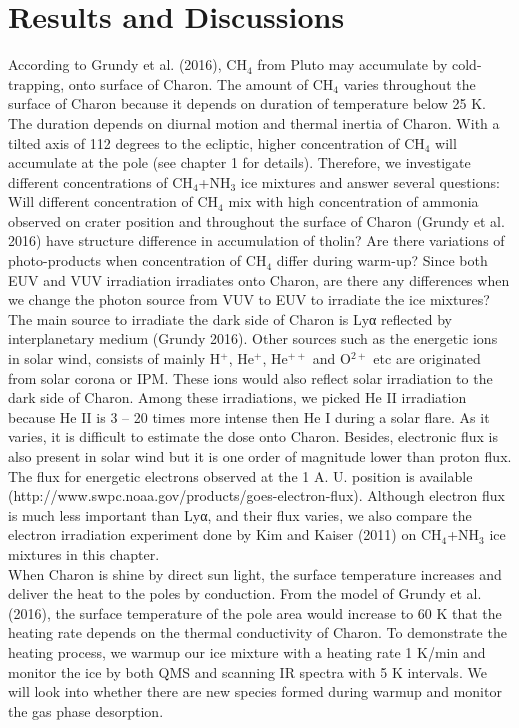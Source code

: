 \chapter{\protect Results and Discussions}

According to Grundy et al. (2016), CH$_4$ from Pluto may accumulate by cold-trapping, onto surface of Charon. The amount of CH$_4$ varies throughout the surface of Charon because it depends on duration of temperature below 25 K. The duration depends on diurnal motion and thermal inertia of Charon. With a tilted axis of 112 degrees to the ecliptic, higher concentration of CH$_4$ will accumulate at the pole (see chapter 1 for details). Therefore, we investigate different concentrations of CH$_4$+NH$_3$ ice mixtures and answer several questions: Will different concentration of CH$_4$ mix with high concentration of ammonia observed on crater position and throughout the surface of Charon (Grundy et al. 2016) have structure difference in accumulation of tholin? Are there variations of photo-products when concentration of CH$_4$ differ during warm-up? Since both EUV and VUV irradiation irradiates onto Charon, are there any differences when we change the photon source from VUV to EUV to irradiate the ice mixtures?\\

The main source to irradiate the dark side of Charon is Lyα reflected by interplanetary medium (Grundy 2016). Other sources such as the energetic ions in solar wind, consists of mainly H$^+$, He$^+$, He$^{++}$ and O$^{2+}$ etc are originated from solar corona or IPM. These ions would also reflect solar irradiation to the dark side of Charon. Among these irradiations, we picked He II irradiation because He II is 3 – 20 times more intense then He I during a solar flare. As it varies, it is difficult to estimate the dose onto Charon. Besides, electronic flux is also present in solar wind but it is one order of magnitude lower than proton flux. The flux for energetic electrons observed at the 1 A. U. position is available (http://www.swpc.noaa.gov/products/goes-electron-flux). Although electron flux is much less important than Lyα, and their flux varies, we also compare the electron irradiation experiment done by Kim and Kaiser (2011) on CH$_4$+NH$_3$ ice mixtures in this chapter. \\

When Charon is shine by direct sun light, the surface temperature increases and deliver the heat to the poles by conduction. From the model of Grundy et al. (2016), the surface temperature of the pole area would increase to 60 K that the heating rate depends on the thermal conductivity of Charon. To demonstrate the heating process, we warmup our ice mixture with a heating rate 1 K/min and monitor the ice by both QMS and scanning IR spectra with 5 K intervals. We will look into whether there are new species formed during warmup and monitor the gas phase desorption.\\

